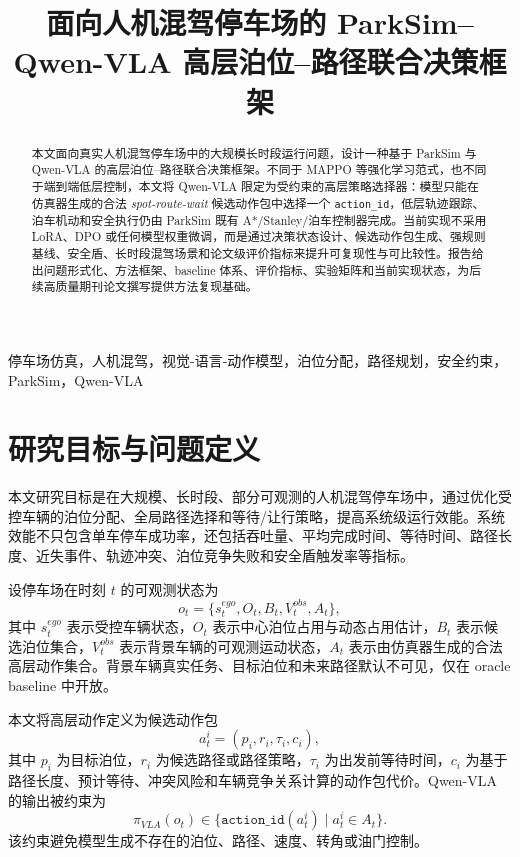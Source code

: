 \documentclass[conference]{IEEEtran}
\title{面向人机混驾停车场的 ParkSim--Qwen-VLA 高层泊位--路径联合决策框架}
\author{\IEEEauthorblockN{项目内部技术报告}
\IEEEauthorblockA{ParkSim-Qwen VLA 实验分支：\texttt{feature/qwen-vla-high-level-policy}}}
\begin{document}
\maketitle

\begin{abstract}
本文面向真实人机混驾停车场中的大规模长时段运行问题，设计一种基于 ParkSim 与 Qwen-VLA 的高层泊位--路径联合决策框架。不同于 MAPPO 等强化学习范式，也不同于端到端低层控制，本文将 Qwen-VLA 限定为受约束的高层策略选择器：模型只能在仿真器生成的合法 \emph{spot-route-wait} 候选动作包中选择一个 \texttt{action\_id}，低层轨迹跟踪、泊车机动和安全执行仍由 ParkSim 既有 A*/Stanley/泊车控制器完成。当前实现不采用 LoRA、DPO 或任何模型权重微调，而是通过决策状态设计、候选动作包生成、强规则基线、安全盾、长时段混驾场景和论文级评价指标来提升可复现性与可比较性。报告给出问题形式化、方法框架、baseline 体系、评价指标、实验矩阵和当前实现状态，为后续高质量期刊论文撰写提供方法复现基础。
\end{abstract}

\begin{IEEEkeywords}
停车场仿真，人机混驾，视觉-语言-动作模型，泊位分配，路径规划，安全约束，ParkSim，Qwen-VLA
\end{IEEEkeywords}

\section{研究目标与问题定义}
本文研究目标是在大规模、长时段、部分可观测的人机混驾停车场中，通过优化受控车辆的泊位分配、全局路径选择和等待/让行策略，提高系统级运行效能。系统效能不只包含单车停车成功率，还包括吞吐量、平均完成时间、等待时间、路径长度、近失事件、轨迹冲突、泊位竞争失败和安全盾触发率等指标。

设停车场在时刻 $t$ 的可观测状态为
\begin{equation}
    o_t = \{s_t^{ego}, O_t, B_t, V_t^{obs}, A_t\},
\end{equation}
其中 $s_t^{ego}$ 表示受控车辆状态，$O_t$ 表示中心泊位占用与动态占用估计，$B_t$ 表示候选泊位集合，$V_t^{obs}$ 表示背景车辆的可观测运动状态，$A_t$ 表示由仿真器生成的合法高层动作集合。背景车辆真实任务、目标泊位和未来路径默认不可见，仅在 oracle baseline 中开放。

本文将高层动作定义为候选动作包
\begin{equation}
    a_t^i = (p_i, r_i, \tau_i, c_i),
\end{equation}
其中 $p_i$ 为目标泊位，$r_i$ 为候选路径或路径策略，$\tau_i$ 为出发前等待时间，$c_i$ 为基于路径长度、预计等待、冲突风险和车辆竞争关系计算的动作包代价。Qwen-VLA 的输出被约束为
\begin{equation}
    \pi_{VLA}(o_t) \in \{\texttt{action\_id}(a_t^i) \mid a_t^i \in A_t\}.
\end{equation}
该约束避免模型生成不存在的泊位、路径、速度、转角或油门控制。
\end{document}
